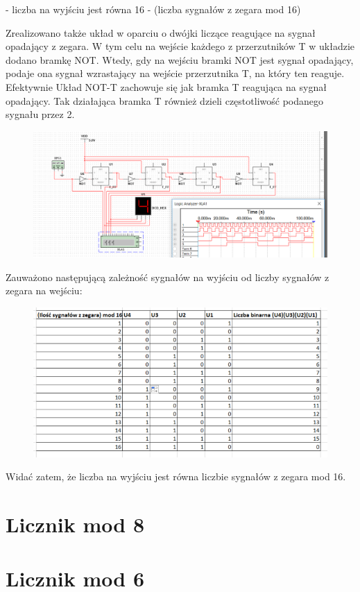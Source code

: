 \documentclass[12pt,a4paper]{article}
\begin{document}
- liczba na wyjściu jest równa 16 - (liczba sygnałów z zegara mod 16)
\par
\par 
Zrealizowano także układ w oparciu o dwójki liczące reagujące na sygnał opadający z zegara. W tym celu na wejście każdego z przerzutników T w układzie dodano bramkę NOT. 
Wtedy, gdy na wejściu bramki NOT jest sygnał opadający, podaje ona sygnał wzrastający na wejście przerzutnika T, na który ten reaguje. Efektywnie Układ NOT-T zachowuje się jak bramka T reagująca na sygnał opadający. Tak działająca bramka T również dzieli częstotliwość podanego sygnału przez 2.

\begin{figure}[H]
\centering
\includegraphics[width=\textwidth]{img/4b_opad}
\end{figure}

Zauważono następującą zależność sygnałów na wyjściu od liczby sygnałów z zegara na wejściu:
\begin{figure}[H]
\centering
\includegraphics[width=\textwidth]{img/4b_opad_table}
\end{figure}

Widać zatem, że liczba na wyjściu jest równa liczbie sygnałów z zegara mod 16.

\section{Licznik mod 8}

\section{Licznik mod 6}
\end{document}
